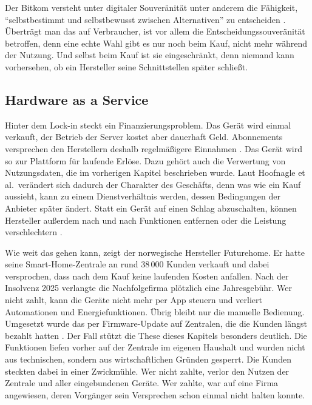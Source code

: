 Der Bitkom versteht unter digitaler Souveränität unter anderem die Fähigkeit,
\enquote{selbstbestimmt und selbstbewusst zwischen Alternativen} zu entscheiden
\cite[S.~7]{bitkom:2015}. Überträgt man das auf Verbraucher, ist vor allem die
Entscheidungssouveränität betroffen, denn eine echte Wahl gibt es nur noch beim
Kauf, nicht mehr während der Nutzung. Und selbst beim Kauf ist sie
eingeschränkt, denn niemand kann vorhersehen, ob ein Hersteller seine
Schnittstellen später schließt.

\subsection{Hardware as a Service}\label{sec:cloud-haas}

Hinter dem Lock-in steckt ein Finanzierungsproblem. Das Gerät wird einmal
verkauft, der Betrieb der Server kostet aber dauerhaft Geld. Abonnements
versprechen den Herstellern deshalb regelmäßigere Einnahmen
\cite[S.~806]{hoofnagle:2019}. Das Gerät wird so zur Plattform für laufende
Erlöse. Dazu gehört auch die Verwertung von Nutzungsdaten, die im vorherigen
Kapitel beschrieben wurde. Laut Hoofnagle et al.\ verändert sich dadurch der
Charakter des Geschäfts, denn was wie ein Kauf aussieht, kann zu einem
Dienstverhältnis werden, dessen Bedingungen der Anbieter später ändert. Statt
ein Gerät auf einen Schlag abzuschalten, können Hersteller außerdem nach und
nach Funktionen entfernen oder die Leistung verschlechtern
\cite[S.~814\,f.]{hoofnagle:2019}.

Wie weit das gehen kann, zeigt der norwegische Hersteller Futurehome. Er hatte
seine Smart-Home-Zentrale an rund 38\,000 Kunden verkauft und dabei versprochen,
dass nach dem Kauf keine laufenden Kosten anfallen. Nach der Insolvenz 2025
verlangte die Nachfolgefirma plötzlich eine Jahresgebühr. Wer nicht zahlt, kann
die Geräte nicht mehr per App steuern und verliert Automationen und
Energiefunktionen. Übrig bleibt nur die manuelle Bedienung. Umgesetzt wurde das
per Firmware-Update auf Zentralen, die die Kunden längst bezahlt hatten
\cite{schoutsen:2025}. Der Fall stützt die These dieses Kapitels besonders deutlich. Die Funktionen liefen vorher auf der Zentrale im eigenen Haushalt und
wurden nicht aus technischen, sondern aus wirtschaftlichen Gründen gesperrt.
Die Kunden steckten dabei in einer Zwickmühle. Wer nicht zahlte, verlor den
Nutzen der Zentrale und aller eingebundenen Geräte. Wer zahlte, war auf eine
Firma angewiesen, deren Vorgänger sein Versprechen schon einmal nicht halten
konnte.

